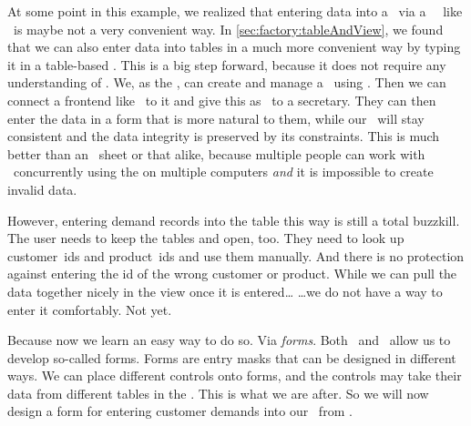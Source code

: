 %
%
At some point in this example, we realized that entering data into a \db\ via a \sql\ \client\ like \psql\ is maybe not a very convenient way.
In \cref{sec:factory:tableAndView}, we found that we can also enter data into tables in a much more convenient way by typing it in a table-based .
This is a big step forward, because it does not require any understanding of \sql.
We, as the , can create and manage a \db\ using \sql.
Then we can connect a frontend like \libreofficeBase\ to it and give this as \client\ to a secretary.
They can then enter the data in a form that is more natural to them, while our \db\ will stay consistent and the data integrity is preserved by its constraints.
This is much better than an \microsoftExcel\ sheet or that alike, because multiple people can work with \db\ concurrently using the  on multiple computers \emph{and} it is impossible to create invalid data.

However, entering demand records into the  table this way is still a total buzzkill.
The user needs to keep the tables  and  open, too.
They need to look up customer~ids and product~ids and use them manually.
And there is no protection against entering the id of the wrong customer or product.
While we can pull the data together nicely in the view  once it is entered{\dots}
{\dots}we do not have a way to enter it comfortably.
Not yet.

Because now we learn an easy way to do so.
Via \emph{forms}.
Both \microsoftAccess\ and \libreofficeBase\ allow us to develop so-called forms.
Forms are entry masks that can be designed in different ways.
We can place different controls onto forms, and the controls may take their data from different tables in the \db.
This is what we are after.
So we will now design a form for entering customer demands into our \db\ from \libreofficeBase.%
%
\FloatBarrier%
\endhsection%
%

